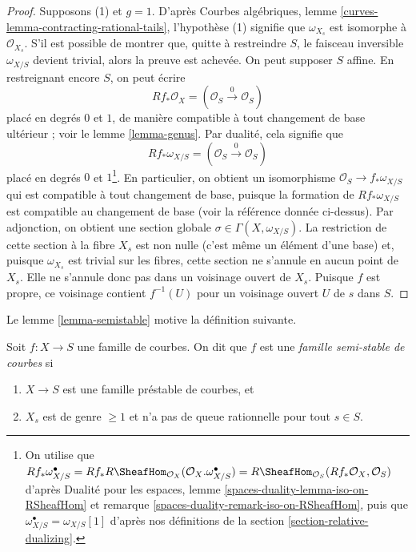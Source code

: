\begin{proof}
\medskip\noindent
Supposons (1) et $g = 1$. D'après
Courbes algébriques, lemme \ref{curves-lemma-contracting-rational-tails},
l'hypothèse (1) signifie que $\omega_{X_s}$ est isomorphe à
$\mathcal{O}_{X_s}$. S'il est possible de montrer que, quitte à restreindre $S$,
le faisceau inversible $\omega_{X/S}$ devient trivial, alors
la preuve est achevée. On peut supposer $S$ affine. En restreignant encore $S$,
on peut écrire
$$
Rf_*\mathcal{O}_X = (\mathcal{O}_S \xrightarrow{0} \mathcal{O}_S)
$$
placé en degrés $0$ et $1$,
de manière compatible à tout changement de base ultérieur ; voir le lemme \ref{lemma-genus}.
Par dualité, cela signifie que
$$
Rf_*\omega_{X/S} = (\mathcal{O}_S \xrightarrow{0} \mathcal{O}_S)
$$
placé en degrés $0$ et $1$\footnote{On utilise que
$Rf_*\omega_{X/S}^\bullet =
Rf_*R\SheafHom_{\mathcal{O}_X}(\mathcal{O}_X. \omega_{X/S}^\bullet) =
R\SheafHom_{\mathcal{O}_S}(Rf_*\mathcal{O}_X, \mathcal{O}_S)$
d'après Dualité pour les espaces, lemme \ref{spaces-duality-lemma-iso-on-RSheafHom} et
remarque \ref{spaces-duality-remark-iso-on-RSheafHom},
puis que $\omega_{X/S}^\bullet = \omega_{X/S}[1]$ d'après
nos définitions de la section \ref{section-relative-dualizing}.}.
En particulier, on obtient un isomorphisme $\mathcal{O}_S \to f_*\omega_{X/S}$
qui est compatible à tout changement de base, puisque la
formation de $Rf_*\omega_{X/S}$ est compatible au changement de base
(voir la référence donnée ci-dessus).
Par adjonction, on obtient une section globale $\sigma \in \Gamma(X, \omega_{X/S})$.
La restriction de cette section à la fibre $X_s$
est non nulle (c'est même un élément d'une base) et, puisque
$\omega_{X_s}$ est trivial sur les fibres,
cette section ne s'annule en aucun point de $X_s$.
Elle ne s'annule donc pas dans
un voisinage ouvert de $X_s$. Puisque $f$ est propre, ce voisinage
contient $f^{-1}(U)$ pour un voisinage ouvert
$U$ de $s$ dans $S$.
\end{proof}

\noindent
Le lemme \ref{lemma-semistable} motive la définition suivante.

\begin{definition}
\label{definition-semistable}
Soit $f : X \to S$ une famille de courbes.
On dit que $f$ est une {\it famille semi-stable de courbes} si
\begin{enumerate}
\item $X \to S$ est une famille préstable de courbes, et
\item $X_s$ est de genre $\geq 1$ et
n'a pas de queue rationnelle pour tout $s \in S$.
\end{enumerate}
\end{definition}

